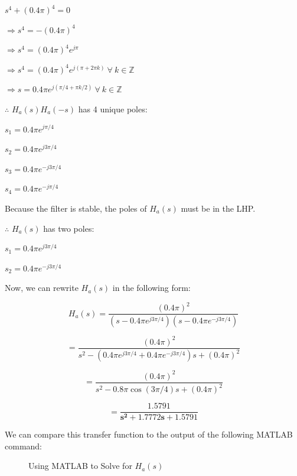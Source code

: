 \documentclass[fleqn]{article}
\begin{document}
\begin{enumerate}[nolistsep]
\begin{enumerate}[nolistsep]
				$s^4 + (0.4\pi)^4 = 0$
				
				$\Rightarrow s^4 = -(0.4\pi)^4$
				
				$\Rightarrow s^4 = (0.4\pi)^4e^{j\pi}$
				
				$\Rightarrow s^4 = (0.4\pi)^4e^{j(\pi + 2{\pi}k)}\ \forall\ k \in \mathbb{Z}$
				
				$\Rightarrow s = 0.4{\pi}e^{j({\pi/4} + {\pi}k/2)}\ \forall\ k \in \mathbb{Z}$
				
				$\therefore$ $H_a(s)H_a(-s)$ has 4 unique poles:
				
				$s_1 = 0.4{\pi}e^{j{\pi}/4}$
				
				$s_2 = 0.4{\pi}e^{j3{\pi}/4}$
				
				$s_3 = 0.4{\pi}e^{-j3{\pi}/4}$
				
				$s_4 = 0.4{\pi}e^{-j{\pi}/4}$
				
				Because the filter is stable, the poles of $H_a(s)$ must be in the LHP.
				
				$\therefore$ $H_a(s)$ has two poles:
				
				$s_1 = 0.4{\pi}e^{j3{\pi}/4}$
				
				$s_2 = 0.4{\pi}e^{-j3{\pi}/4}$
				
				Now, we can rewrite $H_a(s)$ in the following form:
				
				\begin{equation*}
					H_a(s) = \frac{(0.4\pi)^2}{(s - 0.4{\pi}e^{j3{\pi}/4})(s - 0.4{\pi}e^{-j3{\pi}/4})}
				\end{equation*}
				
				\begin{equation*}
					= \frac{(0.4\pi)^2}{s^2 - (0.4{\pi}e^{j3{\pi}/4} + 0.4{\pi}e^{-j3{\pi}/4})s + (0.4\pi)^2}
				\end{equation*}
				
				\begin{equation*}
					= \frac{(0.4\pi)^2}{s^2 - 0.8\pi\cos(3\pi/4)s + (0.4\pi)^2}
				\end{equation*}
				
				\begin{equation*}
					\mathbf{= \frac{1.5791}{s^2 + 1.7772s + 1.5791}}
				\end{equation*}
				
				\pagebreak
				We can compare this transfer function to the output of the following MATLAB command:
				
				\begin{figure}[H]
					\centerline{}
					\caption{Using MATLAB to Solve for $H_a(s)$}
				\end{figure}
				

\end{enumerate}
\end{enumerate}
\end{document}
